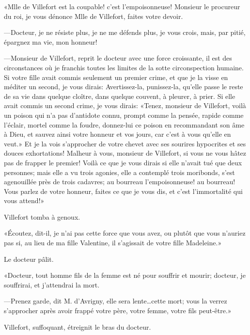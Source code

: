 «Mlle de Villefort est la coupable! c'est l'empoisonneuse! Monsieur le procureur du roi, je vous dénonce Mlle de Villefort, faites votre devoir. 

—Docteur, je ne résiste plus, je ne me défends plus, je vous crois, mais, par pitié, épargnez ma vie, mon honneur! 

—Monsieur de Villefort, reprit le docteur avec une force croissante, il est des circonstances où je franchis toutes les limites de la sotte circonspection humaine. Si votre fille avait commis seulement un premier crime, et que je la visse en méditer un second, je vous dirais: Avertissez-la, punissez-la, qu'elle passe le reste de sa vie dans quelque cloître, dans quelque couvent, à pleurer, à prier. Si elle avait commis un second crime, je vous dirais: «Tenez, monsieur de Villefort, voilà un poison qui n'a pas d'antidote connu, prompt comme la pensée, rapide comme l'éclair, mortel comme la foudre, donnez-lui ce poison en recommandant son âme à Dieu, et sauvez ainsi votre honneur et vos jours, car c'est à vous qu'elle en veut.» Et je la vois s'approcher de votre chevet avec ses sourires hypocrites et ses douces exhortations! Malheur à vous, monsieur de Villefort, si vous ne vous hâtez pas de frapper le premier! Voilà ce que je vous dirais si elle n'avait tué que deux personnes; mais elle a vu trois agonies, elle a contemplé trois moribonds, s'est agenouillée près de trois cadavres; au bourreau l'empoisonneuse! au bourreau! Vous parlez de votre honneur, faites ce que je vous dis, et c'est l'immortalité qui vous attend!» 

Villefort tomba à genoux. 

«Écoutez, dit-il, je n'ai pas cette force que vous avez, ou plutôt que vous n'auriez pas si, au lieu de ma fille Valentine, il s'agissait de votre fille Madeleine.» 

Le docteur pâlit. 

«Docteur, tout homme fils de la femme est né pour souffrir et mourir; docteur, je souffrirai, et j'attendrai la mort. 

—Prenez garde, dit M. d'Avrigny, elle sera lente\dots cette mort; vous la verrez s'approcher après avoir frappé votre père, votre femme, votre fils peut-être.» 

Villefort, suffoquant, étreignit le bras du docteur. 

